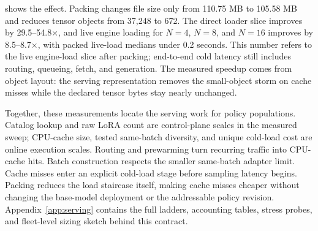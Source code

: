 \begin{table}[H]
\centering
\scriptsize
\setlength{\tabcolsep}{4.0pt}
\renewcommand{\arraystretch}{1.08}
\caption{Packed MoE LoRA loading reduces cold-load overhead by removing tensor fanout. The byte-size change is small; the speedup comes from replacing many tiny tensor objects with a compact serving representation. The final three rows report the median duration of one live load call measured at each cache-miss burst size.}
\label{tab:e4_packed_loader}
\end{table}

 shows the effect. Packing changes file size only from 110.75 MB to 105.58 MB and reduces tensor objects from 37{,}248 to 672. The direct loader slice improves by 29.5--54.8$\times$, and live engine loading for $N=4$, $N=8$, and $N=16$ improves by 8.5--8.7$\times$, with packed live-load medians under 0.2 seconds. This number refers to the live engine-load slice after packing; end-to-end cold latency still includes routing, queueing, fetch, and generation. The measured speedup comes from object layout: the serving representation removes the small-object storm on cache misses while the declared tensor bytes stay nearly unchanged.

\FloatBarrier
Together, these measurements locate the serving work for policy populations. Catalog lookup and raw LoRA count are control-plane scales in the measured sweep; CPU-cache size, tested same-batch diversity, and unique cold-load cost are online execution scales. Routing and prewarming turn recurring traffic into CPU-cache hits. Batch construction respects the smaller same-batch adapter limit. Cache misses enter an explicit cold-load stage before sampling latency begins. Packing reduces the load staircase itself, making cache misses cheaper without changing the base-model deployment or the addressable policy revision. Appendix~\cref{app:serving} contains the full ladders, accounting tables, stress probes, and fleet-level sizing sketch behind this contract.
\FloatBarrier

